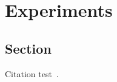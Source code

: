 
\chapter{Experiments}\label{chapter:experiments}

\section{Section}
Citation test~\parencite{latex}.
